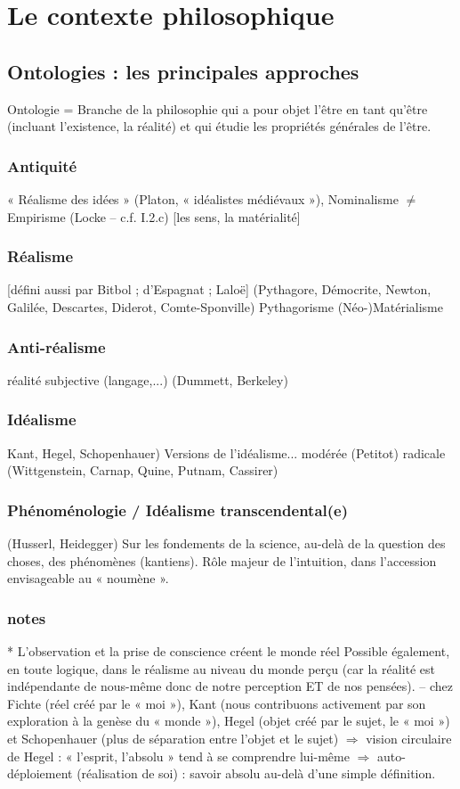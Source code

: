 
\section{Le contexte philosophique}
\subsection{Ontologies : les principales approches}

Ontologie = Branche de la philosophie qui a pour objet l’être en tant qu’être
(incluant l’existence, la réalité) et qui étudie les propriétés
générales de l’être.
\subsubsection{Antiquité}
« Réalisme des idées » (Platon, « idéalistes médiévaux »), Nominalisme
$\neq$ Empirisme (Locke – c.f. I.2.c) [les sens, la matérialité]
\subsubsection{Réalisme}[défini aussi par Bitbol ; d’Espagnat ; Laloë]
(Pythagore, Démocrite, Newton, Galilée, Descartes, Diderot, Comte-Sponville)
Pythagorisme
(Néo-)Matérialisme

\subsubsection{Anti-réalisme}
réalité subjective (langage,...)
(Dummett, Berkeley)
\subsubsection{Idéalisme}
Kant, Hegel, Schopenhauer)
Versions de l’idéalisme...
modérée (Petitot)
radicale (Wittgenstein, Carnap, Quine, Putnam, Cassirer)
\subsubsection{Phénoménologie / Idéalisme transcendental(e)}
(Husserl, Heidegger)
Sur les fondements de la science, au-delà de la question des choses, des
phénomènes (kantiens). Rôle majeur de l’intuition, dans l’accession
envisageable au « noumène ».
\subsubsection{notes}
* L’observation et la prise de conscience créent le monde réel {\footnotesize Possible également, en toute logique, dans le réalisme au niveau du monde perçu (car la réalité est indépendante de
nous-même donc de notre perception ET de nos pensées).} – chez Fichte (réel créé par le
« moi »), Kant (nous contribuons activement par son exploration à la genèse du « monde »),
Hegel (objet créé par le sujet, le « moi ») et Schopenhauer (plus de séparation entre l’objet
et le sujet) $\Rightarrow$ vision circulaire de Hegel : « l’esprit, l’absolu » tend à se
 comprendre lui-même $\Rightarrow$ auto-déploiement (réalisation de soi) : savoir absolu
 au-delà d’une simple définition.
